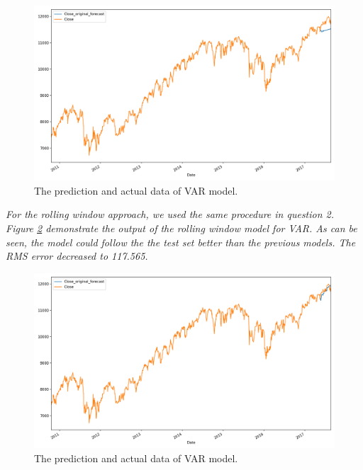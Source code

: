 \begin{figure}[H]
    \centering
    \begin{minipage}[b]{1\textwidth}
        \includegraphics[width=.9\textwidth]{manuscript/src/figures/Ass2/Ass2_Q4_Forecast_vs_Actuals_of_close.png}
    \end{minipage}
    \caption{The prediction and actual data of VAR model.}
    \label{fig:Ass2_Q4_Forecast_vs_Actuals_of_close}
\end{figure}




\textit{For the rolling window approach, we used the same procedure in question 2. Figure \ref{fig:Ass2_Q4_Rolling_Forecast_vs_Actuals_of_close} demonstrate the output of the rolling window model for VAR. As can be seen, the model could follow the the test set better than the previous models. The RMS error decreased to 117.565.}


\begin{figure}[H]
    \centering
    \begin{minipage}[b]{1\textwidth}
        \includegraphics[width=\textwidth]{manuscript/src/figures/Ass2/Ass2_Q4_Rolling_Forecast_vs_Actuals_of_close.png}
    \end{minipage}
    \caption{The prediction and actual data of VAR model.}
    \label{fig:Ass2_Q4_Rolling_Forecast_vs_Actuals_of_close}
\end{figure}